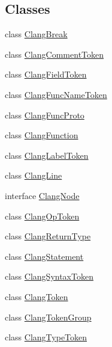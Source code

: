 \subsection*{Classes}
\begin{DoxyCompactItemize}
\item 
class \mbox{\hyperlink{classghidra_1_1app_1_1decompiler_1_1_clang_break}{Clang\+Break}}
\item 
class \mbox{\hyperlink{classghidra_1_1app_1_1decompiler_1_1_clang_comment_token}{Clang\+Comment\+Token}}
\item 
class \mbox{\hyperlink{classghidra_1_1app_1_1decompiler_1_1_clang_field_token}{Clang\+Field\+Token}}
\item 
class \mbox{\hyperlink{classghidra_1_1app_1_1decompiler_1_1_clang_func_name_token}{Clang\+Func\+Name\+Token}}
\item 
class \mbox{\hyperlink{classghidra_1_1app_1_1decompiler_1_1_clang_func_proto}{Clang\+Func\+Proto}}
\item 
class \mbox{\hyperlink{classghidra_1_1app_1_1decompiler_1_1_clang_function}{Clang\+Function}}
\item 
class \mbox{\hyperlink{classghidra_1_1app_1_1decompiler_1_1_clang_label_token}{Clang\+Label\+Token}}
\item 
class \mbox{\hyperlink{classghidra_1_1app_1_1decompiler_1_1_clang_line}{Clang\+Line}}
\item 
interface \mbox{\hyperlink{interfaceghidra_1_1app_1_1decompiler_1_1_clang_node}{Clang\+Node}}
\item 
class \mbox{\hyperlink{classghidra_1_1app_1_1decompiler_1_1_clang_op_token}{Clang\+Op\+Token}}
\item 
class \mbox{\hyperlink{classghidra_1_1app_1_1decompiler_1_1_clang_return_type}{Clang\+Return\+Type}}
\item 
class \mbox{\hyperlink{classghidra_1_1app_1_1decompiler_1_1_clang_statement}{Clang\+Statement}}
\item 
class \mbox{\hyperlink{classghidra_1_1app_1_1decompiler_1_1_clang_syntax_token}{Clang\+Syntax\+Token}}
\item 
class \mbox{\hyperlink{classghidra_1_1app_1_1decompiler_1_1_clang_token}{Clang\+Token}}
\item 
class \mbox{\hyperlink{classghidra_1_1app_1_1decompiler_1_1_clang_token_group}{Clang\+Token\+Group}}
\item 
class \mbox{\hyperlink{classghidra_1_1app_1_1decompiler_1_1_clang_type_token}{Clang\+Type\+Token}}
\item 

\end{DoxyCompactItemize}
